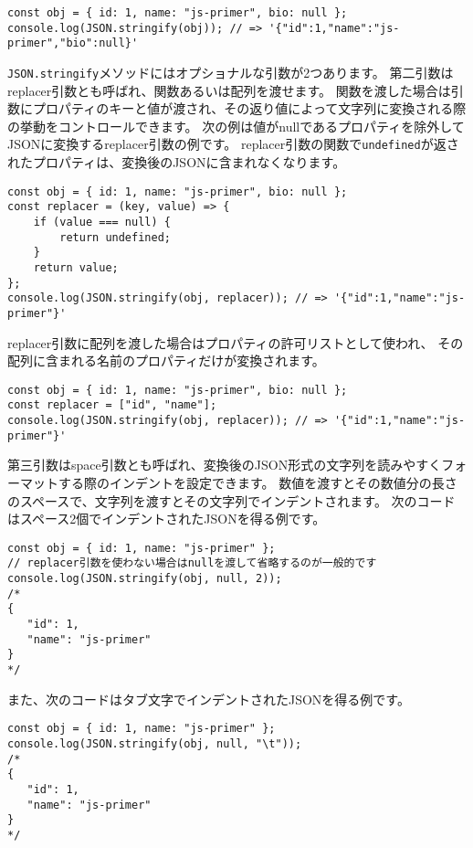 \begin{lstlisting}
const obj = { id: 1, name: "js-primer", bio: null };
console.log(JSON.stringify(obj)); // => '{"id":1,"name":"js-primer","bio":null}'
\end{lstlisting}

\texttt{JSON.stringify}メソッドにはオプショナルな引数が2つあります。
第二引数はreplacer引数とも呼ばれ、関数あるいは配列を渡せます。
関数を渡した場合は引数にプロパティのキーと値が渡され、その返り値によって文字列に変換される際の挙動をコントロールできます。
次の例は値がnullであるプロパティを除外してJSONに変換するreplacer引数の例です。
replacer引数の関数で\texttt{undefined}が返されたプロパティは、変換後のJSONに含まれなくなります。

\begin{lstlisting}
const obj = { id: 1, name: "js-primer", bio: null };
const replacer = (key, value) => {
    if (value === null) {
        return undefined;
    }
    return value;
};
console.log(JSON.stringify(obj, replacer)); // => '{"id":1,"name":"js-primer"}'
\end{lstlisting}

replacer引数に配列を渡した場合はプロパティの許可リストとして使われ、
その配列に含まれる名前のプロパティだけが変換されます。

\begin{lstlisting}
const obj = { id: 1, name: "js-primer", bio: null };
const replacer = ["id", "name"];
console.log(JSON.stringify(obj, replacer)); // => '{"id":1,"name":"js-primer"}'
\end{lstlisting}

第三引数はspace引数とも呼ばれ、変換後のJSON形式の文字列を読みやすくフォーマットする際のインデントを設定できます。
数値を渡すとその数値分の長さのスペースで、文字列を渡すとその文字列でインデントされます。
次のコードはスペース2個でインデントされたJSONを得る例です。

\begin{lstlisting}
const obj = { id: 1, name: "js-primer" };
// replacer引数を使わない場合はnullを渡して省略するのが一般的です
console.log(JSON.stringify(obj, null, 2)); 
/*
{
   "id": 1,
   "name": "js-primer"
}
*/
\end{lstlisting}

また、次のコードはタブ文字でインデントされたJSONを得る例です。
\newpage
\begin{lstlisting}
const obj = { id: 1, name: "js-primer" };
console.log(JSON.stringify(obj, null, "\t")); 
/*
{
   "id": 1,
   "name": "js-primer"
}
*/
\end{lstlisting}

